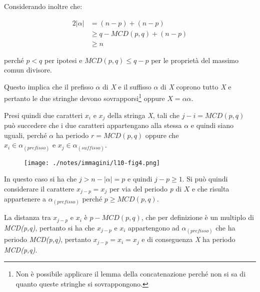 Considerando inoltre che:

\begin{align*}
	2|\alpha| &= (n-p) + (n-p) \\
					 &\geq q - MCD(p,q) + (n-p) \\
					 &\geq n
\end{align*}

perché $ p < q $ per ipotesi e $ MCD(p,q) \leq q - p $ per le proprietà del massimo comun divisore.

Questo implica che il prefisso $ \alpha $ di \textit{X} e il suffisso $ \alpha $ di \textit{X} coprono tutto \textit{X} e pertanto le due stringhe devono sovrapporsi\footnote{Non è possibile applicare il lemma della concatenazione perché non si sa di quanto queste stringhe si sovrappongono.} oppure $ X = \alpha\alpha $.

Presi quindi due caratteri $ x_i $ e $ x_j $ della stringa \textit{X}, tali che $ j - i = MCD(p,q) $ può succedere che i due caratteri appartengano alla stessa $ \alpha $ e quindi siano uguali, perché $ \alpha $ ha periodo $ r = MCD(p,q) $ oppure che $x_i \in \alpha_{(prefisso)} \text{ e } x_j \in \alpha_{(suffisso)} $.

\begin{figure}[htbp]
	\centering
	\texttt{[image: ./notes/immagini/l10-fig4.png]}
\end{figure}


In questo caso si ha che $ j > n - |\alpha| = p $ e quindi $ j - p \geq 1$. Si può quindi considerare il carattere $ x_{j-p} = x_j$ per via del periodo \textit{p} di $ X $ e che risulta appartenere a $ \alpha_{(prefisso)} $ perché $ p \geq MCD(p,q) $.

La distanza tra $ x_{j-p} \text{ e } x_i$ è $p - MCD(p,q)$, che per definizione è un multiplo di \textit{MCD(p,q)}, pertanto si ha che $ x_{j-p} \text{ e } x_i$ appartengono ad $ \alpha_{(prefisso)} $ che ha periodo \textit{MCD(p,q)}, pertanto $ x_{j-p} = x_i = x_j $ e di conseguenza \textit{X} ha periodo \textit{MCD(p,q)}.

